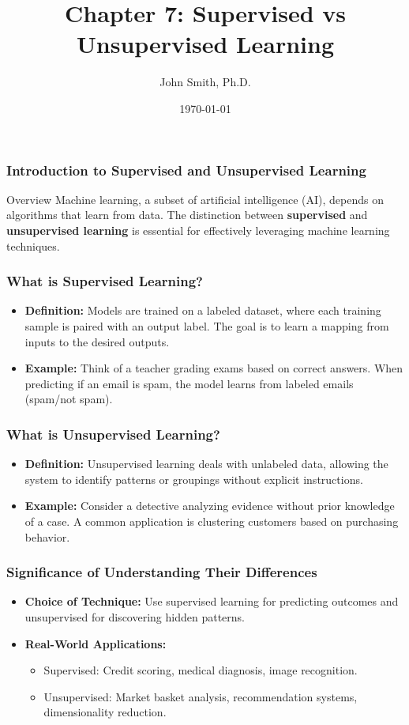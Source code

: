 \documentclass[aspectratio=169]{beamer}
\title[Supervised vs Unsupervised Learning]{Chapter 7: Supervised vs Unsupervised Learning}
\author[J. Smith]{John Smith, Ph.D.}
\institute[University Name]{
  Department of Computer Science\\
  University Name\\
  \vspace{0.3cm}
  Email: email@university.edu\\
  Website: www.university.edu
}
\date{\today}
\begin{document}
\frame{\titlepage}

\begin{frame}[fragile]
    \frametitle{Introduction to Supervised and Unsupervised Learning}
    \begin{block}{Overview}
        Machine learning, a subset of artificial intelligence (AI), depends on algorithms that learn from data. The distinction between \textbf{supervised} and \textbf{unsupervised learning} is essential for effectively leveraging machine learning techniques.
    \end{block}
\end{frame}

\begin{frame}[fragile]
    \frametitle{What is Supervised Learning?}
    \begin{itemize}
        \item \textbf{Definition:} Models are trained on a labeled dataset, where each training sample is paired with an output label. The goal is to learn a mapping from inputs to the desired outputs.
        \item \textbf{Example:} Think of a teacher grading exams based on correct answers. When predicting if an email is spam, the model learns from labeled emails (spam/not spam).
    \end{itemize}
\end{frame}

\begin{frame}[fragile]
    \frametitle{What is Unsupervised Learning?}
    \begin{itemize}
        \item \textbf{Definition:} Unsupervised learning deals with unlabeled data, allowing the system to identify patterns or groupings without explicit instructions.
        \item \textbf{Example:} Consider a detective analyzing evidence without prior knowledge of a case. A common application is clustering customers based on purchasing behavior.
    \end{itemize}
\end{frame}

\begin{frame}[fragile]
    \frametitle{Significance of Understanding Their Differences}
    \begin{itemize}
        \item \textbf{Choice of Technique:} Use supervised learning for predicting outcomes and unsupervised for discovering hidden patterns.
        \item \textbf{Real-World Applications:} 
        \begin{itemize}
            \item Supervised: Credit scoring, medical diagnosis, image recognition.
            \item Unsupervised: Market basket analysis, recommendation systems, dimensionality reduction.
        \end{itemize}
    \end{itemize}
\end{frame}
\end{document}
